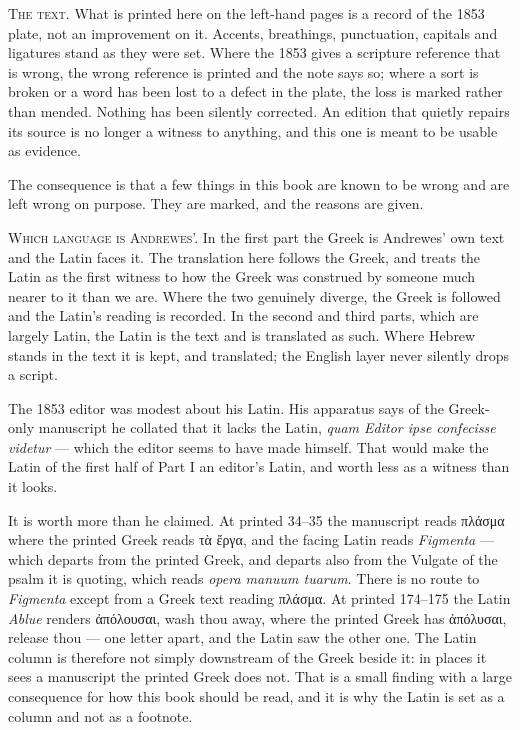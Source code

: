 \vspace{0.8\baselineskip}
{\scshape The text.}\quad
What is printed here on the left-hand pages is a record of the 1853 plate, not an
improvement on it. Accents, breathings, punctuation, capitals and ligatures stand
as they were set. Where the 1853 gives a scripture reference that is wrong, the
wrong reference is printed and the note says so; where a sort is broken or a word
has been lost to a defect in the plate, the loss is marked rather than mended.
Nothing has been silently corrected. An edition that quietly repairs its source
is no longer a witness to anything, and this one is meant to be usable as
evidence.

The consequence is that a few things in this book are known to be wrong and are
left wrong on purpose. They are marked, and the reasons are given.

\vspace{0.8\baselineskip}
{\scshape Which language is Andrewes'.}\quad
In the first part the Greek is Andrewes' own text and the Latin faces it. The
translation here follows the Greek, and treats the Latin as the first witness to
how the Greek was construed by someone much nearer to it than we are. Where the
two genuinely diverge, the Greek is followed and the Latin's reading is recorded.
In the second and third parts, which are largely Latin, the Latin is the text and
is translated as such. Where Hebrew stands in the text it is kept, and translated;
the English layer never silently drops a script.

The 1853 editor was modest about his Latin. His apparatus says of the Greek-only
manuscript he collated that it lacks the Latin, \emph{quam Editor ipse confecisse
videtur} --- which the editor seems to have made himself. That would make the
Latin of the first half of Part I an editor's Latin, and worth less as a witness
than it looks.

It is worth more than he claimed. At printed 34--35 the manuscript reads
πλάσμα where the printed Greek reads τὰ ἔργα, and the facing Latin reads
\emph{Figmenta} --- which departs from the printed Greek, and departs also from
the Vulgate of the psalm it is quoting, which reads \emph{opera manuum tuarum}.
There is no route to \emph{Figmenta} except from a Greek text reading πλάσμα. At
printed 174--175 the Latin \emph{Ablue} renders ἀπόλουσαι, wash thou away, where
the printed Greek has ἀπόλυσαι, release thou --- one letter apart, and the Latin
saw the other one.
The Latin column is therefore not simply downstream of the Greek beside it: in
places it sees a manuscript the printed Greek does not. That is a small finding
with a large consequence for how this book should be read, and it is why the
Latin is set as a column and not as a footnote.

